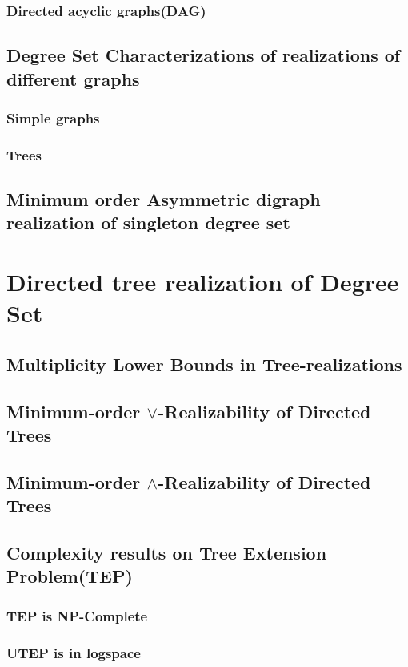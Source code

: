 \documentclass[11pt]{article}
\begin{document}
         \subsubsection{Directed acyclic graphs(DAG)}

     \subsection{Degree Set Characterizations of realizations of different graphs}
         \subsubsection{Simple graphs}
         \subsubsection{Trees}

     \subsection{Minimum order Asymmetric digraph realization of singleton degree set}


\section{Directed tree realization of Degree Set}

      \subsection{Multiplicity Lower Bounds in Tree-realizations}
      \subsection{Minimum-order $\lor$-Realizability of Directed Trees}
      \subsection{Minimum-order $\land$-Realizability of Directed Trees}
      \subsection{Complexity results on Tree Extension Problem(TEP)}
         \subsubsection{TEP is NP-Complete}
         \subsubsection{UTEP is in logspace}
\end{document}
